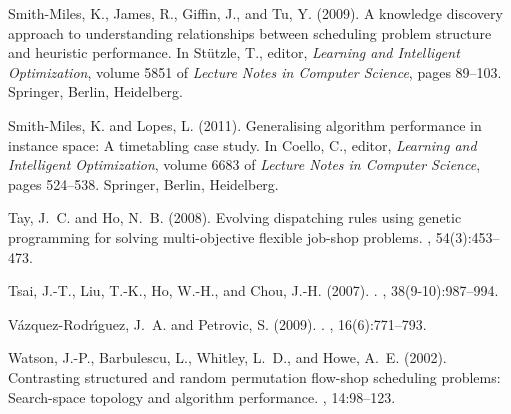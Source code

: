 \documentclass[a4paper,twoside]{article}
\begin{document}
{\begin{thebibliography}{}
Smith-Miles, K., James, R., Giffin, J., and Tu, Y. (2009).
\newblock A knowledge discovery approach to understanding relationships between
  scheduling problem structure and heuristic performance.
\newblock In Stützle, T., editor, {\em Learning and Intelligent Optimization},
  volume 5851 of {\em Lecture Notes in Computer Science}, pages 89--103.
  Springer, Berlin, Heidelberg.

Smith-Miles, K. and Lopes, L. (2011).
\newblock Generalising algorithm performance in instance space: A timetabling
  case study.
\newblock In Coello, C., editor, {\em Learning and Intelligent Optimization},
  volume 6683 of {\em Lecture Notes in Computer Science}, pages 524--538.
  Springer, Berlin, Heidelberg.

Tay, J.~C. and Ho, N.~B. (2008).
\newblock Evolving dispatching rules using genetic programming for solving
  multi-objective flexible job-shop problems.
, 54(3):453--473.

Tsai, J.-T., Liu, T.-K., Ho, W.-H., and Chou, J.-H. (2007).
.
,
  38(9-10):987--994.

V\'{a}zquez-Rodr\'{\i}guez, J.~A. and Petrovic, S. (2009).
.
, 16(6):771--793.

Watson, J.-P., Barbulescu, L., Whitley, L.~D., and Howe, A.~E. (2002).
\newblock Contrasting structured and random permutation flow-shop scheduling
  problems: Search-space topology and algorithm performance.
, 14:98--123.

\end{thebibliography}

}
\end{document}
